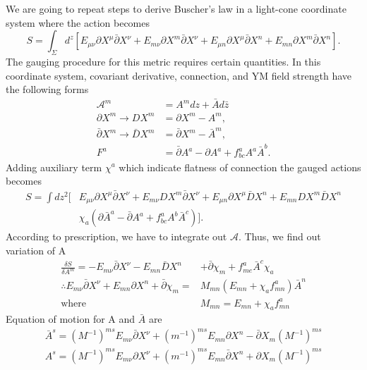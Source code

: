 \documentclass[a4paper]{article}
\begin{document}
We are going to repeat steps to derive Buscher's law in a light-cone coordinate system where the action becomes
\begin{equation}
S = \int_{\Sigma} d^z [ E_{\mu \nu} \partial X^{\mu} \bar{\partial} X^{\nu} + E_{m \nu} \partial X^{m} \bar{\partial} X^{\nu} +E_{\mu n} \partial X^{\mu} \bar{\partial} X^{n} + E_{m n} \partial X^{m} \bar{\partial} X^{n} ].
\end{equation} 
The gauging procedure for this metric requires certain quantities. In this coordinate system, covariant derivative, connection, and YM field strength have the following forms
\begin{align}
  \mathcal{A}^m& = A^m dz + \bar{A} d \bar{z}
  \\
  \partial X^m \to D X^m &= \partial X^m - A^m,
  \\
   \bar{\partial} X^m \to \bar{D} X^m &= \bar{\partial} X^m -\bar{ A}^m,
   \\
   F^a &= \bar{\partial} A^a - \partial A^a + f^a_{b c} A^a \bar{A}^b.
  \end{align}
  Adding auxiliary term $\chi^a$ which indicate flatness of connection the gauged actions becomes
  \begin{align} \nonumber
  S= \int dz^2  [ & E_{ \mu \nu} \partial X^{\mu} \bar{\partial} X^{\nu} +E_{m \nu} D X^{m} \bar{\partial} X^{\nu}	+E_{ \mu n} \partial X^{\mu} \bar{D} X^{n} +E_{ m n} D X^{m} \bar{D} X^{n}
  \\
  &\chi_a \left( \partial \bar{A}^a - \bar{\partial} A^a +f^a_{b c} A^b \bar{A}^c \right) ].
  \end{align}
  According to prescription, we have to integrate out $\mathcal{A}$. Thus, we find out variation of A
  \begin{align} \nonumber
  \frac{\delta S}{\delta A^m} = -E_{m \nu} \bar{\partial} X^{\nu} - E_{m n} \bar{D} X^n & + \bar{\partial} \chi_{m} + f^{a}_{m e} \bar{A}^c \chi_{a} 
  \\
  \therefore E_{m \nu} \bar{\partial} X^{\nu} + E_{m n} \partial X^n + \bar{\partial } \chi_{m} = &M_{m n} (E_{m n} + \chi_a f^a_{m n}) \bar{A}^n 
  \\ \nonumber
  \text{where}~ & M_{m n} =  E_{m n} + \chi_a f^a_{m n}
  \end{align}
  Equation of motion for A and $\bar{A}$ are
  \begin{align}
  \bar{A}^s = (M^{-1})^{m s} E_{m \nu} \bar{\partial}X^{\nu} + (m^{-1}) ^{m s} E_{m n} \partial X^{n} -\bar{\partial}X_{m} (M^{-1})^{m s}
  \\
    A^s = (M^{-1})^{m s} E_{m \nu} {\partial}X^{\nu} + (m^{-1}) ^{m s} E_{m n} \bar{\partial} X^{n} +{\partial}X_{m} (M^{-1})^{m s}
  \end{align}
\end{document}
